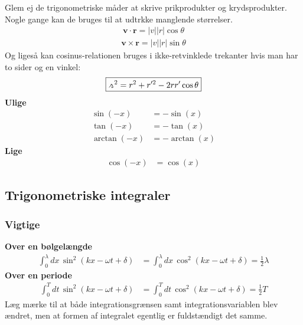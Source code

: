 \documentclass[a4paper]{article}
\begin{document}
    Glem ej de trigonometriske måder at skrive prikprodukter og krydsprodukter. Nogle gange kan de bruges til at udtrkke manglende størrelser.
    \begin{align*}
        \mathbf{v} \cdot \mathbf{r} = |v||r|\cos \theta 
    \end{align*}
    \begin{align*}
        \mathbf{v} \times \mathbf{r} = |v||r| \sin \theta 
    \end{align*}
    Og ligeså kan cosinus-relationen bruges i ikke-retvinklede trekanter hvis man har to sider og en vinkel:
    \begin{align*}
        \boxed{\griffr[2]^{2}  = r^{2} + r^{\prime 2} - 2 r r^{\prime} \cos \theta}
    \end{align*}
    \textbf{Ulige}
    \begin{align*}
        \sin (-x) &= - \sin (x)\\
        \tan (-x) &= - \tan (x)\\
        \arctan(-x) &= - \arctan(x) 
    \end{align*}  
    \textbf{Lige}
    \begin{align*}
        \cos (-x) &= \cos (x)
    \end{align*} 

    \subsection{Trigonometriske integraler}
    \subsubsection{Vigtige}
    \textbf{Over en bølgelængde} 
    \begin{align*}
        \int_0^{\lambda } dx \,\sin^2 (kx - \omega t + \delta )
        &= \int_0^{\lambda } dx \,\cos^2 (kx - \omega t + \delta ) = \frac{1}{2} \lambda
    \end{align*}
    \textbf{Over en periode} 
    \begin{align*}
        \int_0^{T } dt \,\sin^2 (kx - \omega t + \delta )
        &= \int_0^{T } dt \,\cos^2 (kx - \omega t + \delta ) = \frac{1}{2} T
    \end{align*}
    Læg mærke til at både integrationsgrænsen samt integrationsvariablen blev ændret, men at formen af integralet egentlig er fuldstændigt det samme.
    
\end{document}
